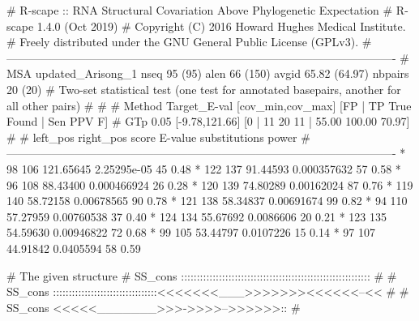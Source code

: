 \begin{sreoutput}
# R-scape :: RNA Structural Covariation Above Phylogenetic Expectation
# R-scape 1.4.0 (Oct 2019)
# Copyright (C) 2016 Howard Hughes Medical Institute.
# Freely distributed under the GNU General Public License (GPLv3).
#-------------------------------------------------------------------------------------------------------
# MSA updated_Arisong_1 nseq 95 (95) alen 66 (150) avgid 65.82 (64.97) nbpairs 20 (20)
# Two-set statistical test (one test for annotated basepairs, another for all other pairs)
#
#
# Method Target_E-val [cov_min,cov_max] [FP | TP True Found | Sen PPV F] 
# GTp    0.05         [-9.78,121.66]     [0 | 11 20 11 | 55.00 100.00 70.97] 
#
#       left_pos       right_pos        score          E-value       substitutions      power
#-------------------------------------------------------------------------------------------------------
*	      98	     106	121.65645	2.25295e-05	45		0.48
*	     122	     137	91.44593	0.000357632	57		0.58
*	      96	     108	88.43400	0.000466924	26		0.28
*	     120	     139	74.80289	0.00162024	87		0.76
*	     119	     140	58.72158	0.00678565	90		0.78
*	     121	     138	58.34837	0.00691674	99		0.82
*	      94	     110	57.27959	0.00760538	37		0.40
*	     124	     134	55.67692	0.0086606	20		0.21
*	     123	     135	54.59630	0.00946822	72		0.68
*	      99	     105	53.44797	0.0107226	15		0.14
*	      97	     107	44.91842	0.0405594	58		0.59

# The given structure
# SS_cons ::::::::::::::::::::::::::::::::::::::::::::::::::::::::::::
#
# SS_cons :::::::::::::::::::::::::::::::::<<<<<<<___>>>>>>><<<<<<--<<
#
# SS_cons <<<<<_______>>>->>>>-->>>>>>::
#


\end{sreoutput}
